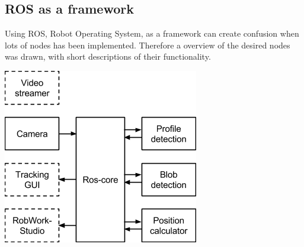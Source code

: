 \subsection{ROS as a framework}
Using ROS, Robot Operating System, as a framework can create confusion when lots of nodes has been implemented. Therefore a overview of the desired nodes was drawn, with short descriptions of their functionality.
\begin{center}
	\includegraphics{imgs/ros_setup}
\end{center} 

